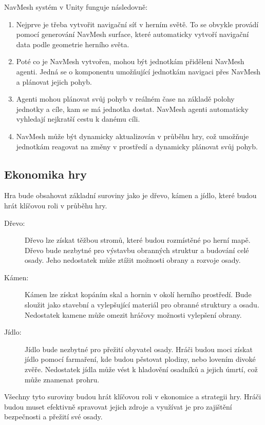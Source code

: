 NavMesh systém v Unity funguje následovně:

\begin{enumerate}
	\item Nejprve je třeba vytvořit navigační síť v herním světě. To se obvykle provádí pomocí generování NavMesh surface, které automaticky vytvoří navigační data podle geometrie herního světa.
	\item Poté co je NavMesh vytvořen, mohou být jednotkám přiděleni NavMesh agenti. Jedná se o komponentu umožňující jednotkám navigaci přes NavMesh a plánovat jejich pohyb.
	\item Agenti mohou plánovat svůj pohyb v reálném čase na základě polohy jednotky a cíle, kam se má jednotka dostat. NavMesh agenti automaticky vyhledají nejkratší cestu k danému cíli.
	\item NavMesh může být dynamicky aktualizován v průběhu hry, což umožňuje jednotkám reagovat na změny v prostředí a dynamicky plánovat svůj pohyb.
\end{enumerate}

\subsection{Ekonomika hry}
Hra bude obsahovat základní suroviny jako je dřevo, kámen a jídlo, které budou hrát klíčovou roli v průběhu hry.

\begin{description}
	\item[Dřevo:] Dřevo lze získat těžbou stromů, které budou rozmístěné po herní mapě. Dřevo bude nezbytné pro výstavbu obranných struktur a budování celé osady. Jeho nedostatek může ztížit možnosti obrany a rozvoje osady.
	\item[Kámen:] Kámen lze získat kopáním skal a hornin v okolí herního prostředí. Bude sloužit jako stavební a vylepšující materiál pro obranné struktury a osadu. Nedostatek kamene může omezit hráčovy možnosti vylepšení obrany.
	\item[Jídlo:] Jídlo bude nezbytné pro přežití obyvatel osady. Hráči budou moci získat jídlo pomocí farmaření, kde budou pěstovat plodiny, nebo lovením divoké zvěře. Nedostatek jídla může vést k hladovění osadníků a jejich úmrtí, což může znamenat prohru.
\end{description}

Všechny tyto suroviny budou hrát klíčovou roli v ekonomice a strategii hry. Hráči budou muset efektivně spravovat jejich zdroje a využívat je pro zajištění bezpečnosti a přežití své osady.

